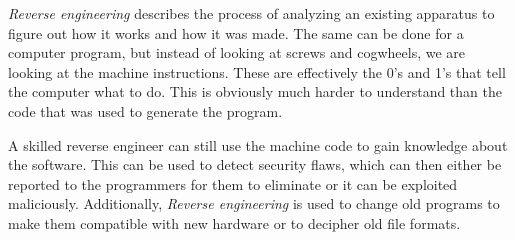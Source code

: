 
\emph{Reverse engineering} describes the process of analyzing an existing apparatus to figure out how it works and how it was made.
The same can be done for a computer program, but instead of looking at screws and cogwheels, we are looking at the machine instructions.
These are effectively the 0's and 1's that tell the computer what to do.
This is obviously much harder to understand than the code that was used to generate the program.

A skilled reverse engineer can still use the machine code to gain knowledge about the software. 
This can be used to detect security flaws, which can then either be reported to the programmers for them to eliminate or it can be exploited maliciously.
Additionally, \emph{Reverse engineering} is used to change old programs to make them compatible with new hardware or to decipher old file formats.

